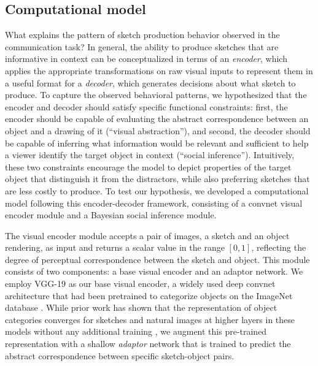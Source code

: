 \documentclass[9pt,twocolumn,twoside]{pnas-new}
\begin{document}

\subsection*{Computational model}

What explains the pattern of sketch production behavior observed in the communication task? 
In general, the ability to produce sketches that are informative in context can be conceptualized in terms of an \textit{encoder}, which applies the appropriate transformations on raw visual inputs to represent them in a useful format for a \textit{decoder}, which generates decisions about what sketch to produce. 
To capture the observed behavioral patterns, we hypothesized that the encoder and decoder should satisfy specific functional constraints: first, the encoder should be capable of evaluating the abstract correspondence between an object and a drawing of it (``visual abstraction''), and second, the decoder should be capable of inferring what information would be relevant and sufficient to help a viewer identify the target object in context (``social inference''). 
Intuitively, these two constraints encourage the model to depict properties of the target object that distinguish it from the distractors, while also preferring sketches that are less costly to produce.
To test our hypothesis, we developed a computational model following this encoder-decoder framework, consisting of a convnet visual encoder module and a Bayesian social inference module. 


The visual encoder module accepts a pair of images, a sketch and an object rendering, as input and returns a scalar value in the range $[0,1]$, reflecting the degree of perceptual correspondence between the sketch and object. This module consists of two components: a base visual encoder and an adaptor network. We employ VGG-19 \cite{simonyan2014very} as our base visual encoder, a widely used deep convnet architecture that had been pretrained to categorize objects on the ImageNet database \cite{deng2009imagenet}. While prior work has shown that the representation of object categories converges for sketches and natural images at higher layers in these models without any additional training \cite{FanCommon2018}, we augment this pre-trained representation with a shallow \textit{adaptor} network that is trained to predict the abstract correspondence between specific sketch-object pairs. 
\end{document}
